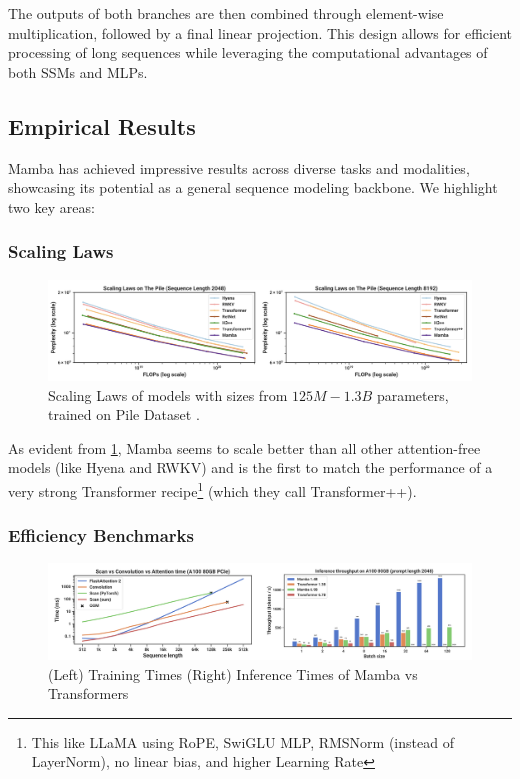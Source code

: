 \documentclass[12pt,a4paper]{report}
\begin{document}
The outputs of both branches are then combined through element-wise multiplication, followed by a final linear projection. This design allows for efficient processing of long sequences while leveraging the computational advantages of both SSMs and MLPs.

\subsection{Empirical Results}

Mamba has achieved impressive results across diverse tasks and modalities, showcasing its potential as a general sequence modeling backbone. We highlight two key areas:

\subsubsection{Scaling Laws}

\begin{figure}[ht]
    \centerline{\includegraphics[scale=0.5]{C4.2.2_Mamba_Scaling.png}}
    \caption{Scaling Laws of models with sizes from $125M - 1.3B$ parameters, trained on Pile Dataset \cite{pileds}.}
    \label{mamba-scale}
\end{figure}

As evident from \ref{mamba-scale}, Mamba seems to scale better than all other attention-free models (like Hyena and RWKV) and is the first to match the performance of a very strong Transformer recipe\footnote{This like LLaMA \cite{llama} using RoPE, SwiGLU MLP, RMSNorm (instead of LayerNorm), no linear bias, and higher Learning Rate} (which they call Transformer++).

\subsubsection{Efficiency Benchmarks}

\begin{figure}[ht]
    \centerline{\includegraphics[scale=0.55]{C4.2.2_Mamba_Eff.png}}
    \caption{(Left) Training Times (Right) Inference Times of Mamba vs Transformers}
    \label{mamba-eff}
\end{figure}
\end{document}
